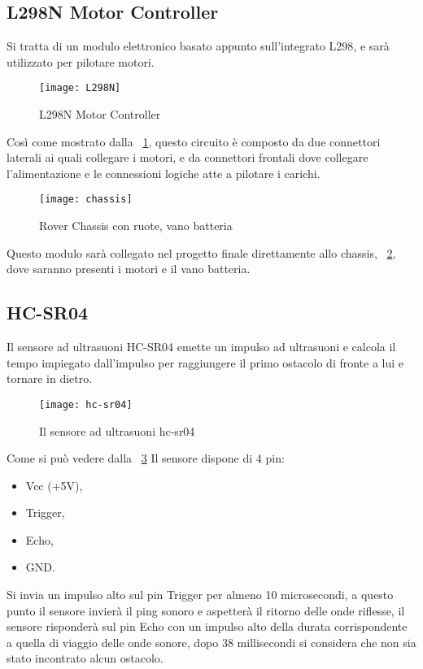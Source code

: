 \subsection{L298N Motor Controller}
Si tratta di un modulo elettronico basato appunto sull’integrato L298, e sarà utilizzato per pilotare motori.

\begin{figure}[htbp!] 
	\centering    
	\texttt{[image: L298N]}
	\caption[L298N Motor Controller]{L298N Motor Controller}
	\label{fig:L298N}
\end{figure}
Così come mostrato dalla \figurename~\ref{fig:L298N}, questo circuito è composto da due connettori laterali ai quali collegare i motori, e da connettori frontali dove collegare l’alimentazione e le connessioni logiche atte a pilotare i carichi.

\begin{figure}[htbp!] 
	\centering    
	\texttt{[image: chassis]}
	\caption[Rover Chassis]{Rover Chassis con ruote, vano batteria}
	\label{fig:chassis}
\end{figure}
Questo modulo sarà collegato nel progetto finale direttamente allo chassis, \figurename~\ref{fig:chassis}, dove saranno presenti i motori e il vano batteria.


\subsection{HC-SR04}
Il  sensore ad ultrasuoni HC-SR04 emette un impulso ad ultrasuoni e calcola il tempo impiegato dall’impulso per raggiungere il primo ostacolo di fronte a lui e tornare in dietro.
\begin{figure}[htbp!] 
	\centering    
	\texttt{[image: hc-sr04]}
	\caption[HC-SR04]{Il sensore ad ultrasuoni hc-sr04}
	\label{fig:hc-sr04}
\end{figure}
Come si può vedere dalla \figurename~\ref{fig:hc-sr04} Il sensore dispone di 4 pin:
\begin{itemize}
 \item Vcc (+5V), 
 \item Trigger, 
 \item Echo, 
 \item GND. 
\end{itemize}
Si invia un impulso alto sul pin Trigger per almeno 10 microsecondi, a questo punto il sensore invierà il ping sonoro e aspetterà il ritorno delle onde riflesse, il sensore risponderà sul pin Echo con un impulso alto della durata corrispondente a quella di viaggio delle onde sonore, dopo 38 millisecondi si considera che non sia stato incontrato alcun ostacolo.

